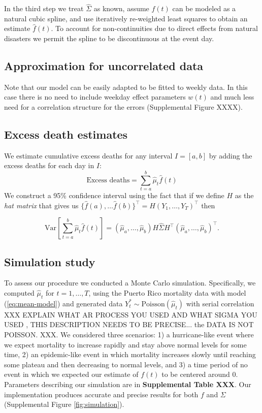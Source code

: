 \documentclass[11pt]{article}
\begin{document}
In the third step we treat $\hat{\Sigma}$ as known, assume $f(t)$ can be modeled as a natural cubic spline, and use iteratively re-weighted least squares to obtain an estimate $\hat{f}(t)$. To account for non-continuities due to direct effects from natural disasters we permit the spline to be discontinuous at the event day. 

\subsection{Approximation for uncorrelated data}
Note that our model can be easily adapted to be fitted to weekly data. In this case there is no need to include weekday effect parameters $w(t)$ and much less need for a correlation structure for the errors (Supplemental Figure XXXX). 

\subsection{Excess death estimates}
\label{subsec:excess-deaths}
We estimate cumulative excess deaths for any interval $I = [a, b]$ 
by adding the excess deaths for each day
in $I$: 
\begin{equation*}
    \mbox{Excess deaths} = \sum_{t = a}^b \hat{\mu}_t \hat{f}(t) 
\end{equation*}
We construct a 95\% confidence interval using the fact that if we define $H$ as the \emph{hat matrix} that gives us 
$\{ \hat{f}(a), \dots \hat{f}(b) \}^\top = H (Y_1, \dots, Y_T)^\top$ then

 \begin{equation*}
    \mbox{Var}\left[\sum_{t = a}^b \hat{\mu}_t \hat{f}(t) \right] = (\hat{\mu}_a,\dots,\hat{\mu}_b) H \hat{\Sigma} H^\top (\hat{\mu}_a,\dots,\hat{\mu}_b)^\top.
 \end{equation*}
 
\subsection{Simulation study}
To assess our procedure we conducted a Monte Carlo simulation. Specifically, we computed $\hat{\mu}_t$ for $t=1,\ldots, T$, using the Puerto Rico mortality data with model (\ref{eq:mean-model}) and generated data $Y_t^* \sim \mbox{Poisson}(\hat{\mu}_t)$ with serial correlation XXX EXPLAIN WHAT AR PROCESS YOU USED AND WHAT SIGMA YOU USED , THIS DESCRIPTION NEEDS TO BE PRECISE... the DATA IS NOT POISSON. XXX. We considered three scenarios: 1) a hurricane-like event where we expect mortality to increase rapidly and stay above normal levels for some time, 2) an epidemic-like event in which mortality increases slowly until reaching some plateau and then decreasing to normal levels, and 3) a time period of no event in which we expected our estimate of $f(t)$ to be centered around 0. Parameters describing our simulation are in \textbf{Supplemental Table XXX}. Our implementation produces accurate and precise results for both $f$ and $\Sigma$ (Supplemental Figure \ref{fig:simulation}).
\end{document}
